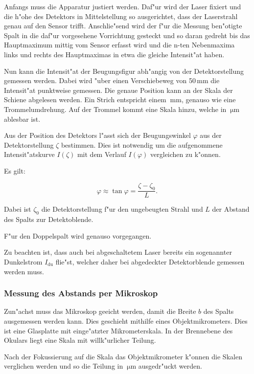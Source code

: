 			Anfangs muss die Apparatur justiert werden. Daf"ur wird der Laser fixiert und die h"ohe des Detektors in Mittelstellung so ausgerichtet, dass der Laserstrahl genau auf den Sensor trifft. Anschlie"send wird der f"ur die Messung ben"otigte Spalt in die daf"ur vorgesehene Vorrichtung gesteckt und so daran gedreht bis das Hauptmaximum mittig vom Sensor erfasst wird und die n-ten Nebenmaxima links und rechts des Hauptmaximas in etwa die gleiche Intensit"at haben.

			Nun kann die Intensit"at der Beugungsfigur abh"angig von der Detektorstellung gemessen werden. Dabei wird "uber einen Verschiebeweg von 50\,mm die Intensit"at punktweise gemessen. Die genaue Position kann an der Skala der Schiene abgelesen werden. Ein Strich entspricht einem $\SI{}{\milli \meter}$, genauso wie eine Trommelumdrehung. Auf der Trommel kommt eine Skala hinzu, welche in $\SI{}{\micro \meter}$ ablesbar ist.

			Aus der Position des Detektors l"asst sich der Beugungswinkel $\varphi$ aus der Detektorstellung $\zeta$ bestimmen. Dies ist notwendig um die aufgenommene Intensit"atskurve $I(\zeta)$ mit dem Verlauf $I(\varphi)$ vergleichen zu k"onnen.

			Es gilt:

			\begin{equation}
				\varphi \approx \tan{\varphi} = \frac{\zeta - \zeta_0}{L}.
			\end{equation}

			Dabei ist $\zeta_0$ die Detektorstellung f"ur den ungebeugten Strahl und $L$ der Abstand des Spalts zur Detektoblende.

			F"ur den Doppelspalt wird genauso vorgegangen.

			Zu beachten ist, dass auch bei abgeschaltetem Laser bereits ein sogenannter Dunkelstrom $I_{\text{du}}$ flie"st, welcher daher bei abgedeckter Detektorblende gemessen werden muss.

		\subsubsection{Messung des Abstands per Mikroskop}
			\label{sec:messung_mikro}

			Zun"achst muss das Mikroskop geeicht werden, damit die Breite $b$ des Spalts ausgemessen werden kann. Dies geschieht mithilfe eines Objektmikrometers. Dies ist eine Glasplatte mit einge"atzter Mikrometerskala. In der Brennebene des Okulars liegt eine Skala mit willk"urlicher Teilung. 

			Nach der Fokussierung auf die Skala das Objektmikrometer k"onnen die Skalen verglichen werden und so die Teilung in $\SI{}{\micro \meter}$ ausgedr"uckt werden.
